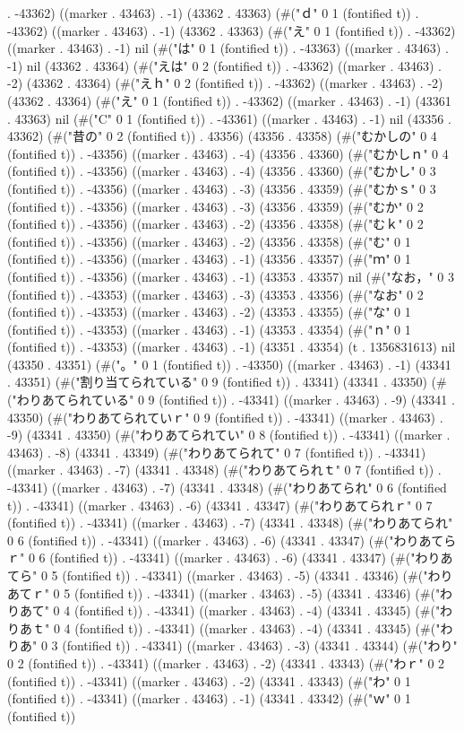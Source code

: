 . -43362) ((marker . 43463) . -1) (43362 . 43363) (#("ｄ" 0 1 (fontified t)) . -43362) ((marker . 43463) . -1) (43362 . 43363) (#("え" 0 1 (fontified t)) . -43362) ((marker . 43463) . -1) nil (#("は" 0 1 (fontified t)) . -43363) ((marker . 43463) . -1) nil (43362 . 43364) (#("えは" 0 2 (fontified t)) . -43362) ((marker . 43463) . -2) (43362 . 43364) (#("えｈ" 0 2 (fontified t)) . -43362) ((marker . 43463) . -2) (43362 . 43364) (#("え" 0 1 (fontified t)) . -43362) ((marker . 43463) . -1) (43361 . 43363) nil (#("C" 0 1 (fontified t)) . -43361) ((marker . 43463) . -1) nil (43356 . 43362) (#("昔の" 0 2 (fontified t)) . 43356) (43356 . 43358) (#("むかしの" 0 4 (fontified t)) . -43356) ((marker . 43463) . -4) (43356 . 43360) (#("むかしｎ" 0 4 (fontified t)) . -43356) ((marker . 43463) . -4) (43356 . 43360) (#("むかし" 0 3 (fontified t)) . -43356) ((marker . 43463) . -3) (43356 . 43359) (#("むかｓ" 0 3 (fontified t)) . -43356) ((marker . 43463) . -3) (43356 . 43359) (#("むか" 0 2 (fontified t)) . -43356) ((marker . 43463) . -2) (43356 . 43358) (#("むｋ" 0 2 (fontified t)) . -43356) ((marker . 43463) . -2) (43356 . 43358) (#("む" 0 1 (fontified t)) . -43356) ((marker . 43463) . -1) (43356 . 43357) (#("ｍ" 0 1 (fontified t)) . -43356) ((marker . 43463) . -1) (43353 . 43357) nil (#("なお，" 0 3 (fontified t)) . -43353) ((marker . 43463) . -3) (43353 . 43356) (#("なお" 0 2 (fontified t)) . -43353) ((marker . 43463) . -2) (43353 . 43355) (#("な" 0 1 (fontified t)) . -43353) ((marker . 43463) . -1) (43353 . 43354) (#("ｎ" 0 1 (fontified t)) . -43353) ((marker . 43463) . -1) (43351 . 43354) (t . 1356831613) nil (43350 . 43351) (#("。" 0 1 (fontified t)) . -43350) ((marker . 43463) . -1) (43341 . 43351) (#("割り当てられている" 0 9 (fontified t)) . 43341) (43341 . 43350) (#("わりあてられている" 0 9 (fontified t)) . -43341) ((marker . 43463) . -9) (43341 . 43350) (#("わりあてられていｒ" 0 9 (fontified t)) . -43341) ((marker . 43463) . -9) (43341 . 43350) (#("わりあてられてい" 0 8 (fontified t)) . -43341) ((marker . 43463) . -8) (43341 . 43349) (#("わりあてられて" 0 7 (fontified t)) . -43341) ((marker . 43463) . -7) (43341 . 43348) (#("わりあてられｔ" 0 7 (fontified t)) . -43341) ((marker . 43463) . -7) (43341 . 43348) (#("わりあてられ" 0 6 (fontified t)) . -43341) ((marker . 43463) . -6) (43341 . 43347) (#("わりあてられｒ" 0 7 (fontified t)) . -43341) ((marker . 43463) . -7) (43341 . 43348) (#("わりあてられ" 0 6 (fontified t)) . -43341) ((marker . 43463) . -6) (43341 . 43347) (#("わりあてらｒ" 0 6 (fontified t)) . -43341) ((marker . 43463) . -6) (43341 . 43347) (#("わりあてら" 0 5 (fontified t)) . -43341) ((marker . 43463) . -5) (43341 . 43346) (#("わりあてｒ" 0 5 (fontified t)) . -43341) ((marker . 43463) . -5) (43341 . 43346) (#("わりあて" 0 4 (fontified t)) . -43341) ((marker . 43463) . -4) (43341 . 43345) (#("わりあｔ" 0 4 (fontified t)) . -43341) ((marker . 43463) . -4) (43341 . 43345) (#("わりあ" 0 3 (fontified t)) . -43341) ((marker . 43463) . -3) (43341 . 43344) (#("わり" 0 2 (fontified t)) . -43341) ((marker . 43463) . -2) (43341 . 43343) (#("わｒ" 0 2 (fontified t)) . -43341) ((marker . 43463) . -2) (43341 . 43343) (#("わ" 0 1 (fontified t)) . -43341) ((marker . 43463) . -1) (43341 . 43342) (#("ｗ" 0 1 (fontified t)) 